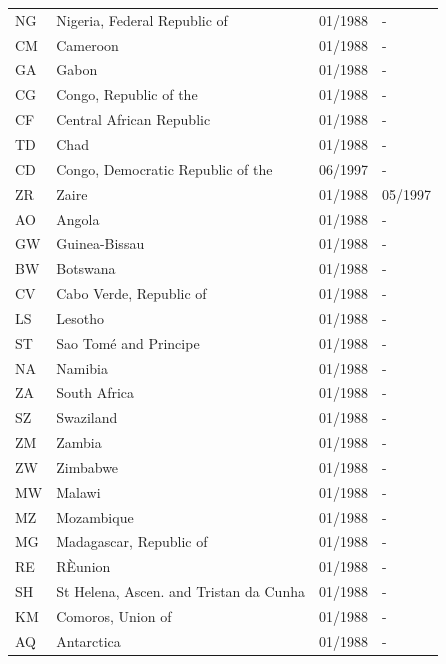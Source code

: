 \begin{footnotesize}
\begin{longtable}{lp{8cm}p{2cm}p{2cm}}
	NG & Nigeria, Federal Republic of           & 01/1988 & -  \\
	CM & Cameroon                               & 01/1988 & -  \\
	GA & Gabon                                  & 01/1988 & -  \\
	CG & Congo, Republic of the                 & 01/1988 & -  \\
	CF & Central African Republic               & 01/1988 & -  \\
	TD & Chad                                   & 01/1988 & -  \\
	CD & Congo, Democratic Republic of the      & 06/1997 & -  \\
	ZR & Zaire                                  & 01/1988 & 05/1997  \\
	AO & Angola                                 & 01/1988 & -  \\
	GW & Guinea-Bissau                          & 01/1988 & -  \\
	BW & Botswana                               & 01/1988 & -  \\
	CV & Cabo Verde, Republic of                & 01/1988 & -  \\
	LS & Lesotho                                & 01/1988 & -  \\
	ST & Sao Tomé and Principe                  & 01/1988 & -  \\
	NA & Namibia                                & 01/1988 & -  \\
	ZA & South Africa                           & 01/1988 & -  \\
	SZ & Swaziland                              & 01/1988 & -  \\
	ZM & Zambia                                 & 01/1988 & -  \\
	ZW & Zimbabwe                               & 01/1988 & -  \\
	MW & Malawi                                 & 01/1988 & -  \\
	MZ & Mozambique                             & 01/1988 & -  \\
	MG & Madagascar, Republic of                & 01/1988 & -  \\
	RE & RÈunion                                & 01/1988 & -  \\
	SH & St Helena, Ascen. and Tristan da Cunha & 01/1988 & -  \\
	KM & Comoros, Union of                      & 01/1988 & -  \\
	AQ & Antarctica                             & 01/1988 & -  \\

\end{longtable}
\end{footnotesize}
